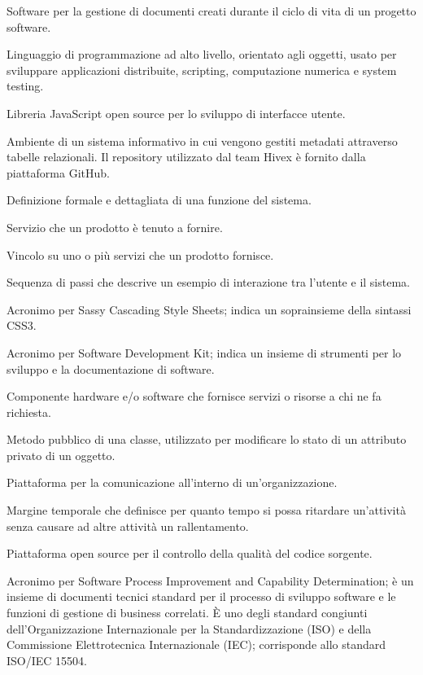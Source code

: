 \item[PragmaDB] Software per la gestione di documenti creati durante il ciclo di vita di un progetto software.
\item[Python] Linguaggio di programmazione ad alto livello, orientato agli oggetti, usato per sviluppare applicazioni distribuite, scripting, computazione numerica e system testing.
\item[React.js] Libreria JavaScript open source per lo sviluppo di interfacce utente.
\item[repository] Ambiente di un sistema informativo in cui vengono gestiti metadati attraverso tabelle relazionali. Il repository utilizzato dal team Hivex è fornito dalla piattaforma GitHub.
\item[requisito di sistema] Definizione formale e dettagliata di una funzione del sistema.
\item[requisito funzionale] Servizio che un prodotto è tenuto a fornire.
\item[requisito non funzionale] Vincolo su uno o più servizi che un prodotto fornisce.
\item[scenario] Sequenza di passi che descrive un esempio di interazione tra l'utente e il sistema.
\item[SCSS] Acronimo per Sassy Cascading Style Sheets; indica un soprainsieme della sintassi CSS3.
\item[SDK] Acronimo per Software Development Kit; indica un insieme di strumenti per lo sviluppo e la documentazione di software.
\item[server] Componente hardware e/o software che fornisce servizi o risorse a chi ne fa richiesta.
\item[setter] Metodo pubblico di una classe, utilizzato per modificare lo stato di un attributo privato di un oggetto.
\item[Slack] Piattaforma per la comunicazione all'interno di un'organizzazione.
\item[ periodo di slack] Margine temporale che definisce per quanto tempo si possa ritardare un’attività senza causare ad altre attività un rallentamento.
\item[SonarQube] Piattaforma open source per il controllo della qualità del codice sorgente.
\item[SPICE] Acronimo per Software Process Improvement and Capability Determination; è un insieme di documenti tecnici standard per il processo di sviluppo software e le funzioni di gestione di business correlati. È uno degli standard congiunti dell’Organizzazione Internazionale per la Standardizzazione (ISO) e della Commissione Elettrotecnica Internazionale (IEC); corrisponde allo standard ISO/IEC 15504.
